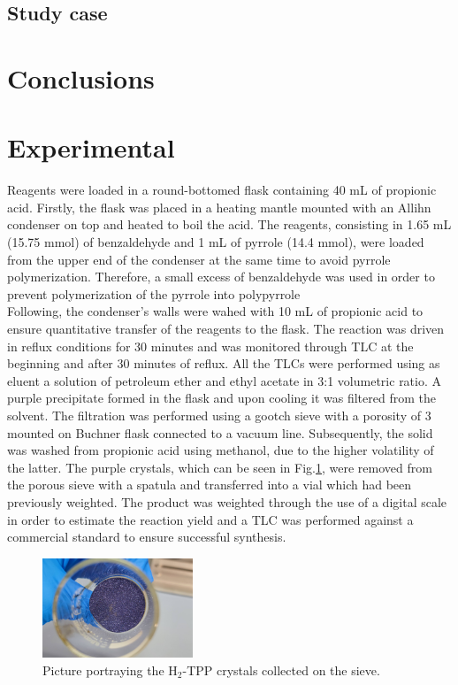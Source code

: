 \documentclass[num-refs]{wiley-article}
\begin{document}
\subsection{Study case}
\section{Conclusions}
\section{Experimental}
Reagents were loaded in a round-bottomed flask containing 40 mL of propionic acid.
Firstly, the flask was placed in a heating mantle mounted with an Allihn condenser on top and heated to boil the acid.
The reagents, consisting in 1.65 mL (15.75 mmol) of benzaldehyde and 1 mL of pyrrole (14.4 mmol), were loaded from the upper end of the condenser at the same time to avoid pyrrole polymerization.
Therefore, a small excess of benzaldehyde was used in order to prevent polymerization of the pyrrole into polypyrrole \\
Following, the condenser's walls were wahed with 10 mL of propionic acid to ensure quantitative transfer of the reagents to the flask.
The reaction was driven in reflux conditions for 30 minutes and was monitored through TLC at the beginning and after 30 minutes of reflux.
All the TLCs were performed using as eluent a solution of petroleum ether and ethyl acetate in 3:1 volumetric ratio.
A purple precipitate formed in the flask and upon cooling it was filtered from the solvent.
The filtration was performed using a gootch sieve with a porosity of 3 mounted on Buchner flask connected to a vacuum line.
Subsequently, the solid was washed from propionic acid using methanol, due to the higher volatility of the latter.
The purple crystals, which can be seen in Fig.\ref{pic-tpp}, were removed from the porous sieve with a spatula and transferred into a vial which had been previously weighted.
The product was weighted through the use of a digital scale in order to estimate the reaction yield and a TLC was performed against a commercial standard to ensure successful synthesis.\\
\begin{figure}[h]
    \centering
    \includegraphics[width=0.4\textwidth]{photo-tpp}
    \caption{Picture portraying the H$_{2}$-TPP crystals collected on the sieve.}
    \label{pic-tpp}
\end{figure}
\end{document}
